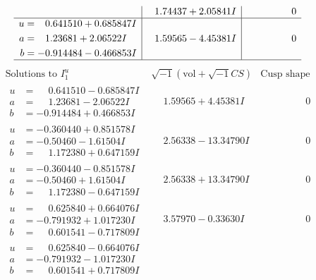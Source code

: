 \documentclass[1p]{elsarticle_modified}
\theoremstyle{definition}
\newcommand{\I}{\sqrt{-1}}
\begin{document}
$$\begin{array}{c|c|c}
 & \phantom{-}1.74437 + 2.05841 I & \phantom{-0.000000 } 0 \\ \hline\begin{aligned}
u &= \phantom{-}0.641510 + 0.685847 I \\
a &= \phantom{-}1.23681 + 2.06522 I \\
b &= -0.914484 - 0.466853 I\end{aligned}
 & \phantom{-}1.59565 - 4.45381 I & \phantom{-0.000000 } 0\\
 \hline 
 \end{array}$$\newpage$$\begin{array}{c|c|c}  
\text{Solutions to }I^u_{1}& \I (\text{vol} + \sqrt{-1}CS) & \text{Cusp shape}\\
 \hline 
\begin{aligned}
u &= \phantom{-}0.641510 - 0.685847 I \\
a &= \phantom{-}1.23681 - 2.06522 I \\
b &= -0.914484 + 0.466853 I\end{aligned}
 & \phantom{-}1.59565 + 4.45381 I & \phantom{-0.000000 } 0 \\ \hline\begin{aligned}
u &= -0.360440 + 0.851578 I \\
a &= -0.50460 - 1.61504 I \\
b &= \phantom{-}1.172380 + 0.647159 I\end{aligned}
 & \phantom{-}2.56338 - 13.34790 I & \phantom{-0.000000 } 0 \\ \hline\begin{aligned}
u &= -0.360440 - 0.851578 I \\
a &= -0.50460 + 1.61504 I \\
b &= \phantom{-}1.172380 - 0.647159 I\end{aligned}
 & \phantom{-}2.56338 + 13.34790 I & \phantom{-0.000000 } 0 \\ \hline\begin{aligned}
u &= \phantom{-}0.625840 + 0.664076 I \\
a &= -0.791932 + 1.017230 I \\
b &= \phantom{-}0.601541 - 0.717809 I\end{aligned}
 & \phantom{-}3.57970 - 0.33630 I & \phantom{-0.000000 } 0 \\ \hline\begin{aligned}
u &= \phantom{-}0.625840 - 0.664076 I \\
a &= -0.791932 - 1.017230 I \\
b &= \phantom{-}0.601541 + 0.717809 I\end{aligned}

\end{array}$$
\end{document}
